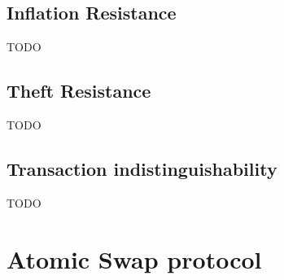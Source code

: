 \subsection{Inflation Resistance} \label{subsec:atom:prf-inflation-resistance}

TODO

\subsection{Theft Resistance} \label{subsec:atom:prf-theft-resistance}

TODO

\subsection{Transaction indistinguishability} \label{subsec:atom:prf-tx-indistinguishability}

TODO

\section{Atomic Swap protocol}\label{sec:atom:atomic-swap}

